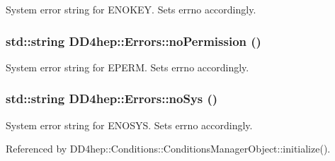 System error string for ENOKEY. Sets errno accordingly. \hypertarget{namespace_d_d4hep_1_1_errors_aa34e378024a1269ccd3f23a0c9d9607b}{
\subsubsection[{noPermission}]{\setlength{\rightskip}{0pt plus 5cm}std::string DD4hep::Errors::noPermission ()}}
\label{namespace_d_d4hep_1_1_errors_aa34e378024a1269ccd3f23a0c9d9607b}


System error string for EPERM. Sets errno accordingly. \hypertarget{namespace_d_d4hep_1_1_errors_a70d74e1cb3eced52822c830c2bf4990b}{
\subsubsection[{noSys}]{\setlength{\rightskip}{0pt plus 5cm}std::string DD4hep::Errors::noSys ()}}
\label{namespace_d_d4hep_1_1_errors_a70d74e1cb3eced52822c830c2bf4990b}


System error string for ENOSYS. Sets errno accordingly. 

Referenced by DD4hep::Conditions::ConditionsManagerObject::initialize().